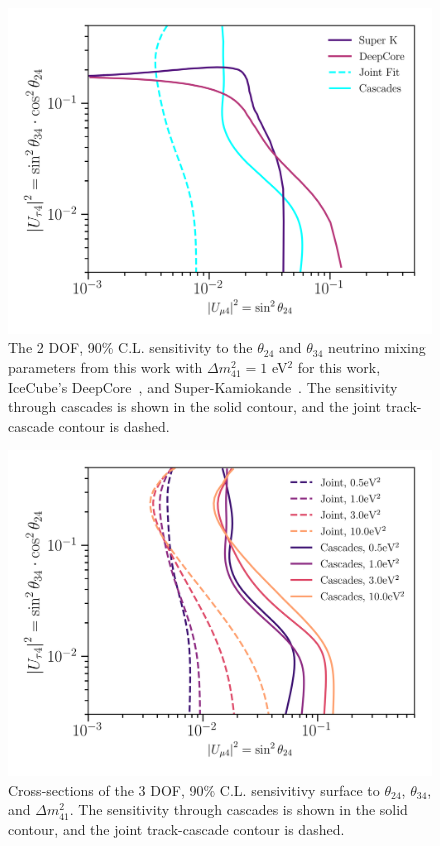 \documentclass[main.tex]{subfiles}
\begin{document}
\begin{figure}
    \centering
    \includegraphics[width=0.99\linewidth]{figures/superPlot_1.00.png}
    \caption{The 2 DOF, 90\% C.L. sensitivity to the $\theta_{24}$ and $\theta_{34}$ neutrino mixing parameters from this work with $\Delta m_{41}^{2}=1$ eV$^{2}$ for this work, IceCube's DeepCore~\cite{Aartsen_2017_dc}, and Super-Kamiokande~\cite{PhysRevD.91.052019}. The sensitivity through cascades is shown in the solid contour, and the joint track-cascade contour is dashed.}\label{fig:jointplot}
\end{figure}


\begin{figure}
    \centering
    \includegraphics[width=0.99\linewidth]{figures/manyPlot.png}
    \caption{Cross-sections of the 3 DOF, 90\% C.L. sensivitivy surface to $\theta_{24}$,  $\theta_{34}$, and $\Delta m_{41}^{2}$. The sensitivity through cascades is shown in the solid contour, and the joint track-cascade contour is dashed.}\label{fig:manyplot}
\end{figure}
\end{document}
